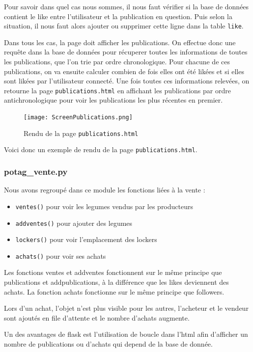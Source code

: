 \documentclass[11pt]{article}
\begin{document}
Pour savoir dans quel cas nous sommes, il nous faut vérifier si la base de données contient le like entre l'utilisateur et la publication en question. Puis selon la situation, il nous faut alors ajouter ou supprimer cette ligne dans la table \texttt{like}.

Dans tous les cas, la page doit afficher les publications. On effectue donc une requête dans la base de données pour récuperer toutes les informations de toutes les publications, que l'on trie par ordre chronologique. Pour chacune de ces publications, on va ensuite calculer combien de fois elles ont été likées et si elles sont likées par l'utilisateur connecté. Une fois toutes ces informations relevées, on retourne la page \texttt{publications.html} en affichant les publications par ordre antichronologique pour voir les publications les plus récentes en premier.

\begin{figure}[h]
    \centering
    \texttt{[image: ScreenPublications.png]}
    \caption{Rendu de la page \texttt{publications.html}}
\end{figure}

Voici donc un exemple de rendu de la page \texttt{publications.html}.

\subsubsection{potag\_vente.py}
Nous avons regroupé dans ce module les fonctions liées à la vente :

\begin{itemize} 
\item \texttt{ventes()} pour voir les legumes vendus par les producteurs
\item \texttt{addventes()} pour ajouter des legumes
\item \texttt{lockers()} pour voir l'emplacement des lockers
\item \texttt{achats()} pour voir ses achats
\end{itemize} 

Les fonctions ventes et addventes fonctionnent sur le même principe que publications et addpublications, à la différence que les likes deviennent des achats. La fonction achats fonctionne sur le même principe que followers.

Lors d'un achat, l'objet n'est plus visible pour les autres, l'acheteur et le vendeur sont ajoutés en file d'attente et le nombre d'achats augmente.

Un des avantages de flask est l'utilisation de boucle dans l'html afin d'afficher un nombre de publications ou d'achats qui depend de la base de donnée.
\end{document}
